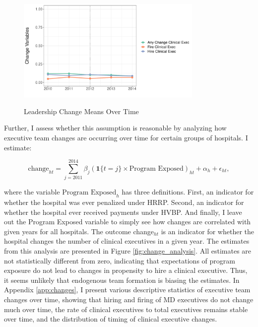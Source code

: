 \documentclass[12pt]{article}
\begin{document}
    \begin{figure}[ht!]
    \centering
    \caption{Leadership Change Means Over Time}
    \includegraphics[width=0.8\textwidth]{Objects/change_means.pdf}
    \label{fig:change_means}
     \end{figure}

    Further, I assess whether this assumption is reasonable by analyzing how executive team changes are occurring over time for certain groups of hospitals. I estimate:

    \begin{equation}\label{eq:change2}
    \text{change}_{ht} = \sum_{j=2011}^{2014}\beta_j(\mathbf{1}\{t=j\}\times \text{Program Exposed})_{ht} + \alpha_h + \epsilon_{ht},
    \end{equation}

    where the variable $\text{Program Exposed}_{h}$ has three definitions. First, an indicator for whether the hospital was ever penalized under HRRP. Second, an indicator for whether the hospital ever received payments under HVBP. And finally, I leave out the Program Exposed variable to simply see how changes are correlated with given years for all hospitals. The outcome change$_{ht}$ is an indicator for whether the hospital changes the number of clinical executives in a given year. The estimates from this analysis are presented in Figure \ref{fig:change_analysis}. All estimates are not statistically different from zero, indicating that expectations of program exposure do not lead to changes in propensity to hire a clinical executive. Thus, it seems unlikely that endogenous team formation is biasing the estimates. In Appendix \ref{app:changes}, I present various descriptive statistics of executive team changes over time, showing that hiring and firing of MD executives do not change much over time, the rate of clinical executives to total executives remains stable over time, and the distribution of timing of clinical executive changes. 
\end{document}
